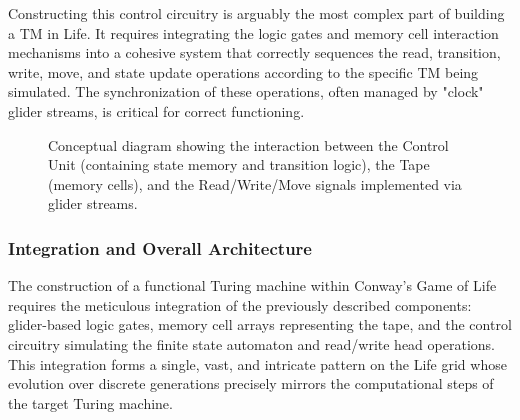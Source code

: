 \documentclass{article}
\theoremstyle{definition}
\theoremstyle{plain}
\theoremstyle{plain}
\begin{document}
Constructing this control circuitry is arguably the most complex part of building a TM in Life. It requires integrating the logic gates and memory cell interaction mechanisms into a cohesive system that correctly sequences the read, transition, write, move, and state update operations according to the specific TM being simulated. The synchronization of these operations, often managed by "clock" glider streams, is critical for correct functioning.

\begin{figure}[H]
  \centering
  \caption{Conceptual diagram showing the interaction between the Control Unit (containing state memory and transition logic), the Tape (memory cells), and the Read/Write/Move signals implemented via glider streams.}
  \label{fig:tm-control}
\end{figure}

\subsubsection{Integration and Overall Architecture}

The construction of a functional Turing machine within Conway's Game of Life requires the meticulous integration of the previously described components: glider-based logic gates, memory cell arrays representing the tape, and the control circuitry simulating the finite state automaton and read/write head operations. This integration forms a single, vast, and intricate pattern on the Life grid whose evolution over discrete generations precisely mirrors the computational steps of the target Turing machine.
\end{document}
